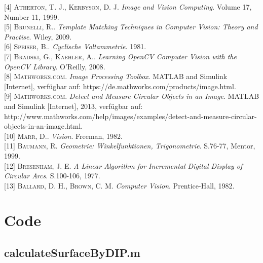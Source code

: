 \documentclass[accentcolor=tud1c, 11pt, toc=bib, toc=listof, captions=abovetable, parskip=half]{tudreport}
\begin{document}
{[4]} \textsc{Atherton, T. J., Kerbyson, D. J}. \textit{Image and Vision Computing}. Volume 17, Number 11, 1999.\\

{[5]} \textsc{Brunelli, R.}. \textit{Template Matching Techniques in Computer Vision: Theory and Practise}. Wiley, 2009.\\

{[6]} \textsc{Speiser, B.}. \textit{Cyclische Voltammetrie}. 1981.\\

{[7]} \textsc{Bradski, G., Kaehler, A.}. \textit{Learning OpenCV Computer Vision with the OpenCV Library}. O'Reilly, 2008.\\

{[8]} \textsc{Mathworks.com}. \textit{Image Processing Toolbox}. MATLAB and Simulink [Internet], verfügbar auf: https://de.mathworks.com/products/image.html.\\

{[9]} \textsc{Mathworks.com}. \textit{Detect and Measure Circular Objects in an Image}. MATLAB and Simulink [Internet], 2013, verfügbar auf: http://www.mathworks.com/help/images/examples/detect-and-measure-circular-objects-in-an-image.html.\\

{[10]} \textsc{Marr, D.}. \textit{Vision}. Freeman, 1982.\\

{[11]} \textsc{Baumann, R}. \textit{Geometrie: Winkelfunktionen, Trigonometrie}. S.76-77, Mentor, 1999.\\

{[12]} \textsc{Bresenham, J. E}. \textit{A Linear Algorithm for Incremental Digital Display of Circular Arcs}. S.100-106, 1977.\\

{[13]} \textsc{Ballard, D. H., Brown, C. M}. \textit{Computer Vision}. Prentice-Hall, 1982.\\
	
\clearpage


\appendix
{}
\chapter{Code}
\section{calculateSurfaceByDIP.m}

\end{document}
